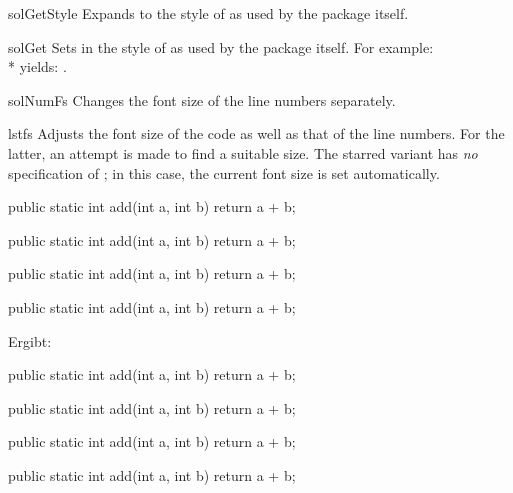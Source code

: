 \documentclass{sopra-base}
\begin{document}
\begin{command}{solGetStyle}{}
    Expands to the style of  as used by the package itself.
\end{command}

\begin{command}{solGet}{}
    Sets  in the style of  as used by the package itself. For example:\\* yields: .
\end{command}

\begin{command}{solNumFs}{}
    Changes the font size of the line numbers separately.
\end{command}

\begin{command}{lstfs}{\optStar{}}
    Adjusts the font size of the code as well as that of the line numbers. For the latter, an attempt is made to find a suitable size.
    The starred variant has \textit{no} specification of ; in this case, the current font size is set automatically.
\begin{latex}[morekeywords={[5]{\\lstfs}}]
\begin{java}
public static int add(int a, int b){ return a + b; }
\end{java}
{
\begin{java}
public static int add(int a, int b){ return a + b; }
\end{java}
}
\begin{java}
public static int add(int a, int b){ return a + b; }
\end{java}
{\tiny
\begin{java}
public static int add(int a, int b){ return a + b; }
\end{java}
}
\end{latex}
Ergibt:
\begin{java}
public static int add(int a, int b){ return a + b; }
\end{java}
{
\begin{java}
public static int add(int a, int b){ return a + b; }
\end{java}
}
\begin{java}
public static int add(int a, int b){ return a + b; }
\end{java}
{\tiny
\begin{java}
public static int add(int a, int b){ return a + b; }
\end{java}
}
\end{command}
\end{document}
